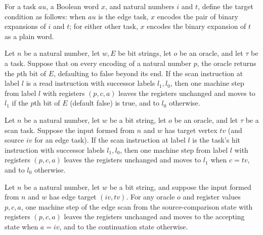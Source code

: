 \begin{definition}
\label{BoolCircuit.AdjScan.Target}
\leanok
{}
For a task $	au$, a Boolean word $x$, and natural numbers $i$ and $t$, define the target
condition as follows: when $	au$ is the edge task, $x$ encodes the pair of binary
expansions of $i$ and $t$; for either other task, $x$ encodes the binary expansion of
$t$ as a plain word.
\end{definition}

\begin{lemma}
\label{BoolCircuit.AdjScan.astep_rd}
\leanok
{}
Let $n$ be a natural number, let $w,E$ be bit strings, let $o$ be an oracle, and let
$\tau$ be a task. Suppose that on every encoding of a natural number $p$, the oracle
returns the $p$th bit of $E$, defaulting to false beyond its end. If the scan
instruction at label $l$ is a read instruction with successor labels $l_1,l_0$, then one
machine step from label $l$ with registers $(p,c,a)$ leaves the registers unchanged and
moves to $l_1$ if the $p$th bit of $E$ (default false) is true, and to $l_0$ otherwise.
\end{lemma}

\begin{lemma}
\label{BoolCircuit.AdjScan.astep_hit}
\leanok
{}
Let $n$ be a natural number, let $w$ be a bit string, let $o$ be an oracle, and let
$\tau$ be a scan task. Suppose the input formed from $n$ and $w$ has target vertex
$tv$ (and source $iv$ for an edge task). If the scan instruction at label $l$ is the
task's hit instruction with successor labels $l_1,l_0$, then one machine step from label
$l$ with registers $(p,c,a)$ leaves the registers unchanged and moves to $l_1$ when
$c=tv$, and to $l_0$ otherwise.
\end{lemma}

\begin{lemma}
\label{BoolCircuit.AdjScan.astep_jeqFst}
\leanok
{}
Let $n$ be a natural number, let $w$ be a bit string, and suppose the input formed from
$n$ and $w$ has edge target $(iv,tv)$. For any oracle $o$ and register values $p,c,a$,
one machine step of the edge scan from the source-comparison state with registers
$(p,c,a)$ leaves the registers unchanged and moves to the accepting state when $a=iv$,
and to the continuation state otherwise.
\end{lemma}

